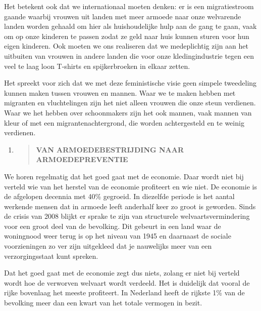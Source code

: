Het betekent ook dat we internationaal moeten denken: er is een
migratiestroom gaande waarbij vrouwen uit landen met meer armoede naar
onze welvarende landen worden gehaald om hier als huishoudelijke hulp
aan de gang te gaan, vaak om op onze kinderen te passen zodat ze geld
naar huis kunnen sturen voor hun eigen kinderen. Ook moeten we ons
realiseren dat we medeplichtig zijn aan het uitbuiten van vrouwen in
andere landen die voor onze kledingindustrie tegen een veel te laag loon
T-shirts en spijkerbroeken in elkaar zetten.

Het spreekt voor zich dat we met deze feministische visie geen simpele
tweedeling kunnen maken tussen vrouwen en mannen. Waar we te maken
hebben met migranten en vluchtelingen zijn het niet alleen vrouwen die
onze steun verdienen. Waar we het hebben over schoonmakers zijn het ook
mannen, vaak mannen van kleur of met een migrantenachtergrond, die
worden achtergesteld en te weinig verdienen.

\begin{enumerate}
\def\labelenumi{\arabic{enumi}.}
\setcounter{enumi}{2}
\item
  \begin{quote}
  \textbf{VAN ARMOEDEBESTRIJDING NAAR ARMOEDEPREVENTIE}
  \end{quote}
\end{enumerate}

We horen regelmatig dat het goed gaat met de economie. Daar wordt niet
bij verteld wie van het herstel van de economie profiteert en wie niet.
De economie is de afgelopen decennia met 40\% gegroeid. In diezelfde
periode is het aantal werkende mensen dat in armoede leeft anderhalf
keer zo groot is geworden. Sinds de crisis van 2008 blijkt er sprake te
zijn van structurele welvaartsvermindering voor een groot deel van de
bevolking. Dit gebeurt in een land waar de woningnood weer terug is op
het niveau van 1945 en daarnaast de sociale voorzieningen zo ver zijn
uitgekleed dat je nauwelijks meer van een verzorgingsstaat kunt spreken.

Dat het goed gaat met de economie zegt dus niets, zolang er niet bij
verteld wordt hoe de verworven welvaart wordt verdeeld. Het is duidelijk
dat vooral de rijke bovenlaag het meeste profiteert. In Nederland heeft
de rijkste 1\% van de bevolking meer dan een kwart van het totale
vermogen in bezit.

